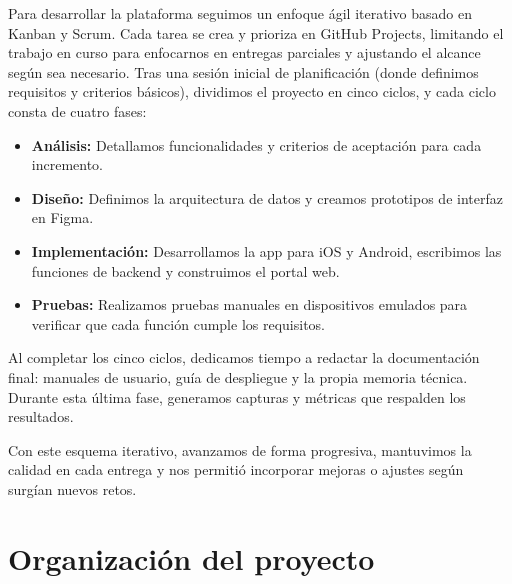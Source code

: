 \begin{large}

Para desarrollar la plataforma seguimos un enfoque ágil iterativo basado en Kanban y Scrum. Cada tarea se crea y prioriza en GitHub Projects, limitando el trabajo en curso para enfocarnos en entregas parciales y ajustando el alcance según sea necesario. Tras una sesión inicial de planificación (donde definimos requisitos y criterios básicos), dividimos el proyecto en cinco ciclos, y cada ciclo consta de cuatro fases:

\begin{itemize}
  \item \textbf{Análisis:} Detallamos funcionalidades y criterios de aceptación para cada incremento.
  \item \textbf{Diseño:} Definimos la arquitectura de datos y creamos prototipos de interfaz en Figma.
  \item \textbf{Implementación:} Desarrollamos la app para iOS y Android, escribimos las funciones de backend y construimos el portal web.  
  \item \textbf{Pruebas:} Realizamos pruebas manuales en dispositivos emulados para verificar que cada función cumple los requisitos.
\end{itemize}

Al completar los cinco ciclos, dedicamos tiempo a redactar la documentación final: manuales de usuario, guía de despliegue y la propia memoria técnica. Durante esta última fase, generamos capturas y métricas que respalden los resultados.

Con este esquema iterativo, avanzamos de forma progresiva, mantuvimos la calidad en cada entrega y nos permitió incorporar mejoras o ajustes según surgían nuevos retos.

\end{large}

\section{Organización del proyecto}


